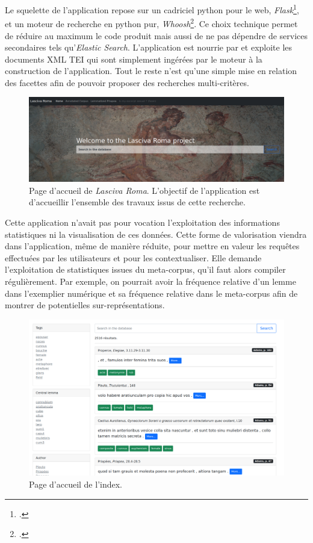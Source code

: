 Le squelette de l'application repose sur un cadriciel python pour le web, \textit{Flask}\footcite{ronacherpallets}, et un moteur de recherche en python pur, \textit{Whoosh}\footcite{whoosh}. Ce choix technique permet de réduire au maximum le code produit mais aussi de ne pas dépendre de services secondaires tels qu'\textit{Elastic Search}. L'application est nourrie par et exploite  les documents XML TEI qui sont simplement ingérées par le moteur à la construction de l'application. Tout le reste n'est qu'une simple mise en relation des facettes afin de pouvoir proposer des recherches multi-critères.

\begin{figure}
    \centering
    \includegraphics[width=.8\linewidth]{figures/chap1/part3/exemplier/AccueilInterface.png}
    \caption{Page d'accueil de \textit{Lasciva Roma}. L'objectif de l'application est d'accueillir l'ensemble des travaux issus de cette recherche.}
    \label{fig:exemplier:accueil}
\end{figure}

Cette application n'avait pas pour vocation l'exploitation des informations statistiques ni la visualisation de ces données. Cette forme de valorisation viendra dans l'application, même de manière réduite, pour mettre en valeur les requêtes effectuées par les utilisateurs et pour les contextualiser. Elle demande l'exploitation de statistiques issues du meta-corpus, qu'il faut alors compiler régulièrement. Par exemple, on pourrait avoir la fréquence relative d'un lemme dans l'exemplier numérique et sa fréquence relative dans le meta-corpus afin de montrer de potentielles sur-représentations.

\begin{figure}
    \centering
    \includegraphics[width=.8\linewidth]{figures/chap1/part3/exemplier/IndexInterface.png}
    \caption{Page d'accueil de l'index.}
    \label{fig:exemplier:index}
\end{figure}

